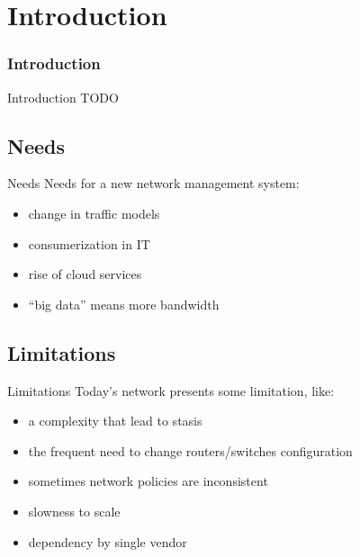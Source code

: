 
\section{Introduction}
\frame
{
\frametitle{Introduction}
\tableofcontents[currentsection]
\addtocounter{framenumber}{-1}
}

\begin{frame}{Introduction}
TODO
\end{frame}

\subsection{Needs}
\begin{frame}{Needs}
Needs for a new network management system:
\begin{itemize}
\item<2-> change in traffic models
\item<3-> consumerization in IT
\item<4-> rise of cloud services
\item<5-> ``big data'' means more bandwidth
\end{itemize}
\end{frame}

\subsection{Limitations}
\begin{frame}{Limitations}
Today's network presents some limitation, like:
\begin{itemize}
\item<2-> a complexity that lead to stasis
\item<3-> the frequent need to change routers/switches configuration
\item<4-> sometimes network policies are inconsistent
\item<5-> slowness to scale
\item<6-> dependency by single vendor
\end{itemize}
\end{frame}
